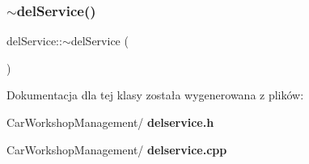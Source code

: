 \subsubsection{$\sim$delService()}
{\footnotesize\ttfamily del\+Service\+::$\sim$del\+Service (\begin{DoxyParamCaption}{ }\end{DoxyParamCaption})}



Dokumentacja dla tej klasy została wygenerowana z plików\+:\begin{DoxyCompactItemize}
\item 
Car\+Workshop\+Management/\textbf{ delservice.\+h}\item 
Car\+Workshop\+Management/\textbf{ delservice.\+cpp}\end{DoxyCompactItemize}

